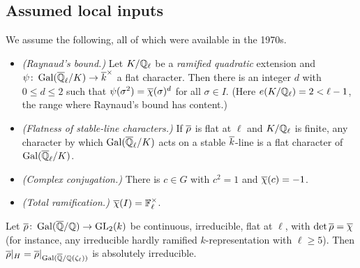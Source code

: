 \documentclass[11pt]{article}
\begin{document}
\subsection*{Assumed local inputs}
We assume the following, all of which were available in the 1970s.
\begin{itemize}
\item[(L1)] \emph{(Raynaud's bound.)} Let $K/\mathbb{Q}_\ell$ be a \emph{ramified quadratic}
extension and $\psi\colon\operatorname{Gal}(\overline{\mathbb{Q}}_\ell/K)\to\overline{k}^\times$ a flat character. Then
there is an integer $d$ with $0\leq d\leq2$ such that
$\psi(\sigma^2)=\overline{\chi}(\sigma)^d$ for all $\sigma\in I$. \textup{(}Here
$e(K/\mathbb{Q}_\ell)=2<\ell-1$, the range where Raynaud's bound has content.\textup{)}
\item[(L2)] \emph{(Flatness of stable-line characters.)} If $\overline{\rho}$ is flat
at $\ell$ and $K/\mathbb{Q}_\ell$ is finite, any character by which $\operatorname{Gal}(\overline{\mathbb{Q}}_\ell/K)$ acts on
a stable $\overline{k}$-line is a flat character of $\operatorname{Gal}(\overline{\mathbb{Q}}_\ell/K)$.
\item[(L3)] \emph{(Complex conjugation.)} There is $c\in G$ with $c^2=1$ and
$\overline{\chi}(c)=-1$.
\item[(L4)] \emph{(Total ramification.)} $\overline{\chi}(I)=\mathbb{F}_\ell^\times$.
\end{itemize}

\begin{theorem}\label{thm:absirr}
Let $\overline{\rho}\colon\operatorname{Gal}(\overline{\mathbb{Q}}/\mathbb{Q})\to\operatorname{GL}_2(k)$ be continuous, irreducible, flat at $\ell$,
with $\det\overline{\rho}=\overline{\chi}$ \textup{(}for instance, any irreducible hardly
ramified $k$-representation with $\ell\geq5$\textup{)}. Then
$\overline{\rho}|_{H}=\overline{\rho}|_{\operatorname{Gal}(\overline{\mathbb{Q}}/\mathbb{Q}(\zeta_\ell))}$ is absolutely irreducible.
\end{theorem}
\end{document}

